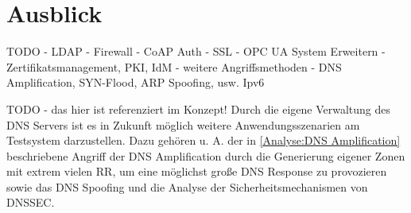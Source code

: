 \chapter{Ausblick}
\label{Ausblick}
TODO -
LDAP -
Firewall -
CoAP Auth -
SSL -
OPC UA System Erweitern - Zertifikatsmanagement, PKI, IdM - 
weitere Angriffsmethoden - DNS Amplification, SYN-Flood, ARP Spoofing, usw.
Ipv6

TODO - das hier ist referenziert im Konzept!
Durch die eigene Verwaltung des \ac{DNS} Servers ist es in Zukunft möglich weitere Anwendungsszenarien am Testsystem darzustellen. Dazu gehören u. A. der in \autoref{Analyse:DNS Amplification} beschriebene Angriff der \ac{DNS} Amplification durch die Generierung eigener Zonen mit extrem vielen \ac{RR}, um eine möglichst große \ac{DNS} Response zu provozieren sowie das \ac{DNS} Spoofing und die Analyse der Sicherheitsmechanismen von \ac{DNSSEC}.